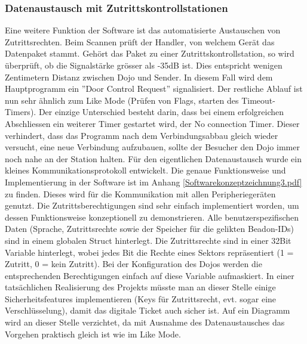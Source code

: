 \subsubsection{Datenaustausch mit Zutrittskontrollstationen}
Eine weitere Funktion der Software ist das automatisierte Austauschen von Zutrittsrechten. Beim Scannen prüft der Handler, von welchem Gerät das Datenpaket stammt. Gehört das Paket zu einer Zutrittskontrollstation, so wird überprüft, ob die Signalstärke grösser als -35dB ist. Dies entspricht wenigen Zentimetern Distanz zwischen Dojo und Sender. In diesem Fall wird dem Hauptprogramm ein ''Door Control Request'' signalisiert. Der restliche Ablauf ist nun sehr ähnlich zum Like Mode (Prüfen von Flags, starten des Timeout-Timers). Der einzige Unterschied besteht darin, dass bei einem erfolgreichen Abschliessen ein weiterer Timer gestartet wird, der No connection Timer. Dieser verhindert, dass das Programm nach dem Verbindungsabbau gleich wieder versucht, eine neue Verbindung aufzubauen, sollte der Besucher den Dojo immer noch nahe an der Station halten.
Für den eigentlichen Datenaustausch wurde ein kleines Kommunikationsprotokoll entwickelt. Die genaue Funktionsweise und Implementierung in der Software ist im Anhang \ref{Softwarekonzeptzeichnung3.pdf} zu finden. Dieses wird für die Kommunikation mit allen Peripheriegeräten genutzt. 
Die Zutrittsberechtigungen sind sehr einfach implementiert worden, um dessen Funktionsweise konzeptionell zu demonstrieren. Alle benutzerspezifischen Daten (Sprache, Zutrittsrechte sowie der Speicher für die gelikten Beadon-IDs) sind in einem globalen Struct hinterlegt. Die Zutrittsrechte sind in einer 32Bit Variable hinterlegt, wobei jedes Bit die Rechte eines Sektors repräsentiert (1 = Zutritt, 0 = kein Zutritt). Bei der Konfiguration des Dojos werden die entsprechenden Berechtigungen einfach auf diese Variable aufmaskiert. In einer tatsächlichen Realisierung des Projekts müsste man an dieser Stelle einige Sicherheitsfeatures implementieren (Keys für Zutrittsrecht, evt. sogar eine Verschlüsselung), damit das digitale Ticket auch sicher ist.
Auf ein Diagramm wird an dieser Stelle verzichtet, da mit Ausnahme des Datenaustausches das Vorgehen praktisch gleich ist wie im Like Mode.

\newpage

